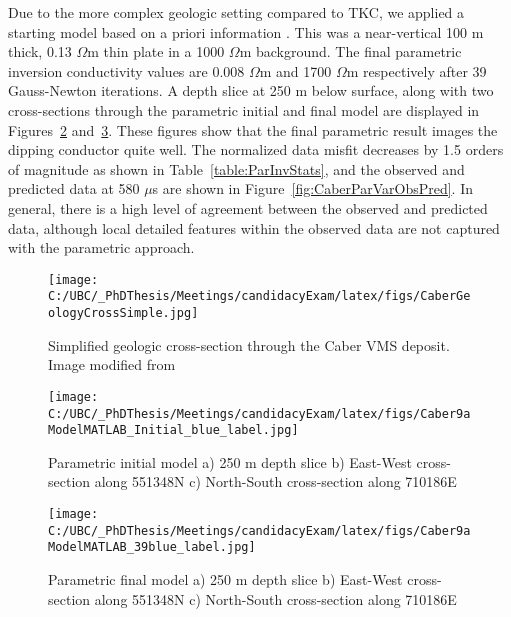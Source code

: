 \documentclass[letterpaper,11pt]{article}
\begin{document}
Due to the more complex geologic setting compared to TKC, we applied a starting model based on a priori information \cite[]{Geotech2012}.  This was a near-vertical 100 m thick, 0.13 $ \Omega $m thin plate in a 1000 $ \Omega $m background.  The final parametric inversion conductivity values are 0.008 $ \Omega $m and 1700 $ \Omega $m respectively after 39 Gauss-Newton iterations. A depth slice at 250 m below surface, along with two cross-sections through the parametric initial and final model are displayed in Figures~\ref{fig:CaberParInitial} and~\ref{fig:CaberParVarCond}.  These figures show that the final parametric result images the dipping conductor quite well.  The normalized data misfit decreases by 1.5 orders of magnitude as shown in Table~\ref{table:ParInvStats}, and the observed and predicted data at 580 $ \mu $s are shown in Figure~\ref{fig:CaberParVarObsPred}. In general, there is a high level of agreement between the observed and predicted data, although local detailed features within the observed data are not captured with the parametric approach.

\begin{figure}[h]
 \centering
  \texttt{[image: C:/UBC/\_PhDThesis/Meetings/candidacyExam/latex/figs/CaberGeologyCrossSimple.jpg]}
   \caption{Simplified geologic cross-section through the Caber VMS deposit. Image modified from \cite{Legault2010}}
   \label{fig:CaberGeology}
\end{figure}

\begin{figure}
\centering
\texttt{[image: C:/UBC/\_PhDThesis/Meetings/candidacyExam/latex/figs/Caber9aModelMATLAB\_Initial\_blue\_label.jpg]}
  \caption{Parametric initial model a) 250 m depth slice b) East-West cross-section along 551348N c) North-South cross-section along 710186E}
  \label{fig:CaberParInitial}
\end{figure}


\begin{figure}
\centering
\texttt{[image: C:/UBC/\_PhDThesis/Meetings/candidacyExam/latex/figs/Caber9aModelMATLAB\_39blue\_label.jpg]}
  \caption{Parametric final model a) 250 m depth slice b) East-West cross-section along 551348N c) North-South cross-section along 710186E}
  \label{fig:CaberParVarCond}
\end{figure}
\end{document}
